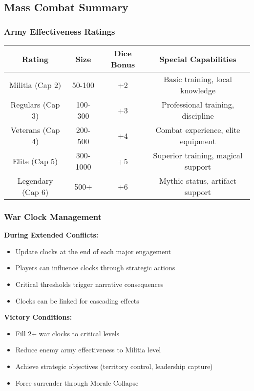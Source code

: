 \documentclass[11pt,letterpaper]{article}
\begin{document}
\subsection{Mass Combat Summary}

\subsubsection{Army Effectiveness Ratings}

\begin{center}
\begin{tabular}{|c|c|c|c|}
\hline
\textbf{Rating} & \textbf{Size} & \textbf{Dice Bonus} & \textbf{Special Capabilities} \\
\hline
Militia (Cap 2) & 50-100 & +2 & Basic training, local knowledge \\
\hline
Regulars (Cap 3) & 100-300 & +3 & Professional training, discipline \\
\hline
Veterans (Cap 4) & 200-500 & +4 & Combat experience, elite equipment \\
\hline
Elite (Cap 5) & 300-1000 & +5 & Superior training, magical support \\
\hline
Legendary (Cap 6) & 500+ & +6 & Mythic status, artifact support \\
\hline
\end{tabular}
\end{center}

\subsubsection{War Clock Management}

\textbf{During Extended Conflicts:}
\begin{itemize}[leftmargin=*]
    \item Update clocks at the end of each major engagement
    \item Players can influence clocks through strategic actions
    \item Critical thresholds trigger narrative consequences
    \item Clocks can be linked for cascading effects
\end{itemize}

\textbf{Victory Conditions:}
\begin{itemize}[leftmargin=*]
    \item Fill 2+ war clocks to critical levels
    \item Reduce enemy army effectiveness to Militia level
    \item Achieve strategic objectives (territory control, leadership capture)
    \item Force surrender through Morale Collapse
\end{itemize}
\end{document}
